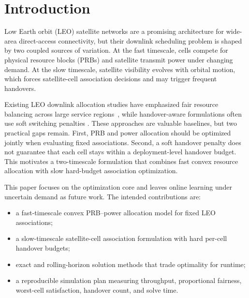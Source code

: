 
\section{Introduction}

Low Earth orbit (LEO) satellite networks are a promising architecture for
wide-area direct-access connectivity, but their downlink scheduling problem is
shaped by two coupled sources of variation. At the fast timescale, cells compete
for physical resource blocks (PRBs) and satellite transmit power under changing
demand. At the slow timescale, satellite visibility evolves with orbital motion,
which forces satellite-cell association decisions and may trigger frequent
handovers.

Existing LEO downlink allocation studies have emphasized fair resource
balancing across large service regions~\cite{leyva2023continent}, while
handover-aware formulations often use soft switching penalties
\cite{afif2025handover}. These approaches are valuable baselines, but two
practical gaps remain. First, PRB and power allocation should be optimized
jointly when evaluating fixed associations. Second, a soft handover penalty does
not guarantee that each cell stays within a deployment-level handover budget.
This motivates a two-timescale formulation that combines fast convex resource
allocation with slow hard-budget association optimization.

This paper focuses on the optimization core and leaves online learning under
uncertain demand as future work. The intended contributions are:
\begin{itemize}
\item a fast-timescale convex PRB--power allocation model for fixed LEO
associations;
\item a slow-timescale satellite-cell association formulation with hard
per-cell handover budgets;
\item exact and rolling-horizon solution methods that trade optimality for
runtime;
\item a reproducible simulation plan measuring throughput, proportional
fairness, worst-cell satisfaction, handover count, and solve time.
\end{itemize}
